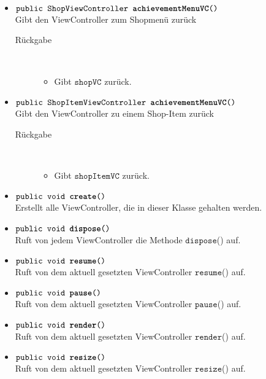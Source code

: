 \begin{description}
\begin{itemize}
		\item $\texttt{public ShopViewController \textbf{achievementMenuVC}()}$ \\ Gibt den ViewController zum Shopmenü zurück
		\begin{description}
			\item[Rückgabe] \hfill \\
			\vspace{-.8cm}
			\begin{itemize}
				\item Gibt $\texttt{shopVC}$ zurück.
			\end{itemize}
			\end{description}
			
		\item $\texttt{public ShopItemViewController \textbf{achievementMenuVC}()}$ \\ Gibt den ViewController zu einem Shop-Item zurück
			\begin{description}
			\item[Rückgabe] \hfill \\
			\vspace{-.8cm}
			\begin{itemize}
				\item Gibt $\texttt{shopItemVC}$ zurück.
			\end{itemize}
			\end{description}

		\item $\texttt{public void \textbf{create}()}$ \\ Erstellt alle ViewController, die in dieser Klasse gehalten werden.
		\item $\texttt{public void \textbf{dispose}()}$ \\ Ruft von jedem ViewController die Methode $\texttt{dispose}$() auf.
		\item $\texttt{public void \textbf{resume}()}$ \\ Ruft von dem aktuell gesetzten ViewController $\texttt{resume}$() auf.
		\item $\texttt{public void \textbf{pause}()}$ \\ Ruft von dem aktuell gesetzten ViewController $\texttt{pause}$() auf.
		\item $\texttt{public void \textbf{render}()}$ \\ Ruft von dem aktuell gesetzten ViewController $\texttt{render}$() auf.
		\item $\texttt{public void \textbf{resize}()}$ \\ Ruft von dem aktuell gesetzten ViewController $\texttt{resize}$() auf.
		

			

		\end{itemize}
	\end{description}
	
